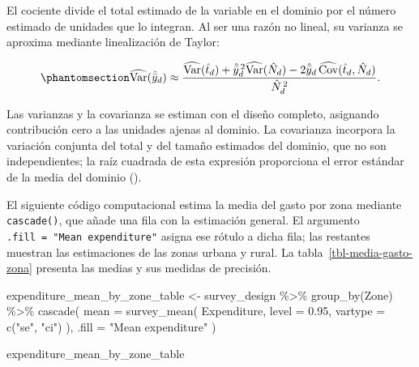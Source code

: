 \documentclass[
  spanish,
  11pt,
  letterpaper,
  oneside,
  open=any]{scrbook}
\newenvironment{Shaded}{\begin{snugshade}}{\end{snugshade}}
\newcommand{\AttributeTok}[1]{\textcolor[rgb]{0.40,0.45,0.13}{#1}}
\newcommand{\FloatTok}[1]{\textcolor[rgb]{0.68,0.00,0.00}{#1}}
\newcommand{\FunctionTok}[1]{\textcolor[rgb]{0.28,0.35,0.67}{#1}}
\newcommand{\NormalTok}[1]{\textcolor[rgb]{0.00,0.23,0.31}{#1}}
\newcommand{\OtherTok}[1]{\textcolor[rgb]{0.00,0.23,0.31}{#1}}
\newcommand{\SpecialCharTok}[1]{\textcolor[rgb]{0.37,0.37,0.37}{#1}}
\newcommand{\StringTok}[1]{\textcolor[rgb]{0.13,0.47,0.30}{#1}}
\begin{document}
El cociente divide el total estimado de la variable en el dominio por el
número estimado de unidades que lo integran. Al ser una razón no lineal,
su varianza se aproxima mediante linealización de Taylor:

\begin{equation}\protect\phantomsection\label{eq-varianza-media-dominio}{
\widehat{\operatorname{Var}}(\hat{\bar{y}}_d)
\approx
\frac{\widehat{\operatorname{Var}}(\hat{t}_d)
+\hat{\bar{y}}_d^{\,2}\widehat{\operatorname{Var}}(\hat{N}_d)
-2\hat{\bar{y}}_d\,\widehat{\operatorname{Cov}}(\hat{t}_d,\hat{N}_d)}
{\hat{N}_d^{\,2}}.
}\end{equation}

Las varianzas y la covarianza se estiman con el diseño completo,
asignando contribución cero a las unidades ajenas al dominio. La
covarianza incorpora la variación conjunta del total y del tamaño
estimados del dominio, que no son independientes; la raíz cuadrada de
esta expresión proporciona el error estándar de la media del dominio
().

El siguiente código computacional estima la media del gasto por zona
mediante \texttt{cascade()}, que añade una fila con la estimación
general. El argumento \texttt{.fill\ =\ "Mean\ expenditure"} asigna ese
rótulo a dicha fila; las restantes muestran las estimaciones de las
zonas urbana y rural. La tabla~\ref{tbl-media-gasto-zona} presenta las
medias y sus medidas de precisión.

\begin{Shaded}
\begin{Highlighting}[]
\NormalTok{expenditure\_mean\_by\_zone\_table }\OtherTok{\textless{}{-}}\NormalTok{ survey\_design }\SpecialCharTok{\%\textgreater{}\%}
  \FunctionTok{group\_by}\NormalTok{(Zone) }\SpecialCharTok{\%\textgreater{}\%}
  \FunctionTok{cascade}\NormalTok{(}
    \AttributeTok{mean =} \FunctionTok{survey\_mean}\NormalTok{(}
\NormalTok{      Expenditure,}
      \AttributeTok{level =} \FloatTok{0.95}\NormalTok{,}
      \AttributeTok{vartype =} \FunctionTok{c}\NormalTok{(}\StringTok{"se"}\NormalTok{, }\StringTok{"ci"}\NormalTok{)}
\NormalTok{    ),}
    \AttributeTok{.fill =} \StringTok{"Mean expenditure"}
\NormalTok{  )}

\NormalTok{expenditure\_mean\_by\_zone\_table}
\end{Highlighting}
\end{Shaded}
\end{document}

